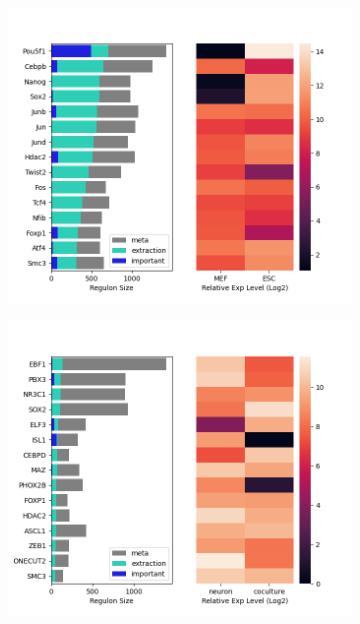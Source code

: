 \documentclass[fleqn,10pt]{wlscirep}
\begin{document}
\begin{figure}
  \begin{subfigure}{0.49\linewidth}
    \centering
    \includegraphics[width=\linewidth, keepaspectratio,]{../images/top_TFs/MEF_ESC.png}
    \caption{}
  \end{subfigure}
  \begin{subfigure}{0.49\linewidth}
    \centering
    \includegraphics[width=\linewidth, keepaspectratio,]{../images/top_TFs/N_cocul.png}
    \caption{}
  \end{subfigure}


\end{figure}
\end{document}
